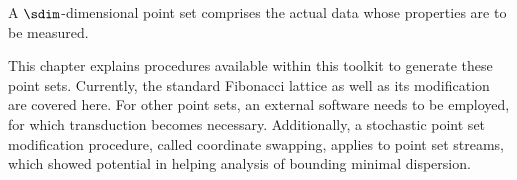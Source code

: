 
A $\sdim$-dimensional point set comprises the actual data whose properties are to be measured.

This chapter explains procedures available within this toolkit to generate these point sets. Currently, the standard Fibonacci lattice as well as its modification are covered here. For other point sets, an external software needs to be employed, for which transduction becomes necessary. Additionally, a stochastic point set modification procedure, called coordinate swapping, applies to point set streams, which showed potential in helping analysis of bounding minimal dispersion.

\clearpage
